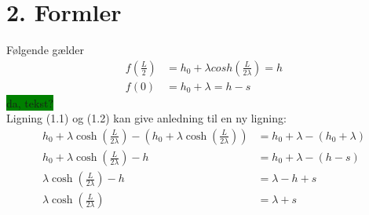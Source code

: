 \section*{2. Formler}
Følgende gælder
\begin{align}
f(\frac{L}{2})	&= h_0 + \lambda cosh (\frac{L}{2 \lambda}) = h\\
f(0)			&= h_0 + \lambda = h-s
\end{align}
%
\colorbox{green}{da, tekst?} 
\\
%

Ligning (1.1) og (1.2) kan give anledning til en ny ligning:
%
\begin{align}
h_0 + \lambda \cosh (\frac{L}{2 \lambda}) -(h_0 + \lambda \cosh (\frac{L}{2 \lambda})) &= h_0 + \lambda -(h_0 + \lambda)\\
h_0 + \lambda \cosh (\frac{L}{2 \lambda}) - h &= h_0 + \lambda - (h - s)\\
\lambda \cosh (\frac{L}{2 \lambda}) - h &= \lambda - h + s\\
\lambda \cosh (\frac{L}{2 \lambda}) &= \lambda + s
\end{align}